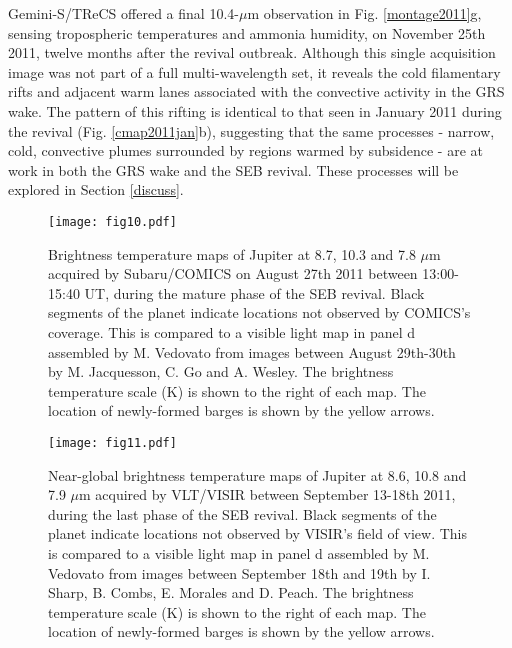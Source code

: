 \documentclass[final,authoryear,5p,times,twocolumn]{elsarticle}
\begin{document}
Gemini-S/TReCS offered a final 10.4-$\mu$m observation in Fig. \ref{montage2011}g, sensing tropospheric temperatures and ammonia humidity, on November 25th 2011, twelve months after the revival outbreak.  Although this single acquisition image was not part of a full multi-wavelength set, it reveals the cold filamentary rifts and adjacent warm lanes associated with the convective activity in the GRS wake.  The pattern of this rifting is identical to that seen in January 2011 during the revival (Fig. \ref{cmap2011jan}b), suggesting that the same processes - narrow, cold, convective plumes surrounded by regions warmed by subsidence - are at work in both the GRS wake and the SEB revival.  These processes will be explored in Section \ref{discuss}.

\begin{figure*}
\begin{centering}
\centerline{\texttt{[image: fig10.pdf]}}
\caption{Brightness temperature maps of Jupiter at 8.7, 10.3 and 7.8 $\mu$m acquired by Subaru/COMICS on August 27th 2011 between 13:00-15:40 UT, during the mature phase of the SEB revival.  Black segments of the planet indicate locations not observed by COMICS's coverage. This is compared to a visible light map in panel d assembled by M. Vedovato from images between August 29th-30th by M. Jacquesson, C. Go and A. Wesley.  The brightness temperature scale (K) is shown to the right of each map.  The location of newly-formed barges is shown by the yellow arrows.}
\label{cmap2011aug}
\end{centering}
\end{figure*}

\begin{figure*}
\begin{centering}
\centerline{\texttt{[image: fig11.pdf]}}
\caption{Near-global brightness temperature maps of Jupiter at 8.6, 10.8 and 7.9 $\mu$m acquired by VLT/VISIR between September 13-18th 2011, during the last phase of the SEB revival.  Black segments of the planet indicate locations not observed by VISIR's field of view.  This is compared to a visible light map in panel d assembled by M. Vedovato from images between September 18th and 19th by I. Sharp, B. Combs, E. Morales and D. Peach. The brightness temperature scale (K) is shown to the right of each map. The location of newly-formed barges is shown by the yellow arrows. }
\label{cmap2011sep}
\end{centering}
\end{figure*}
\end{document}
